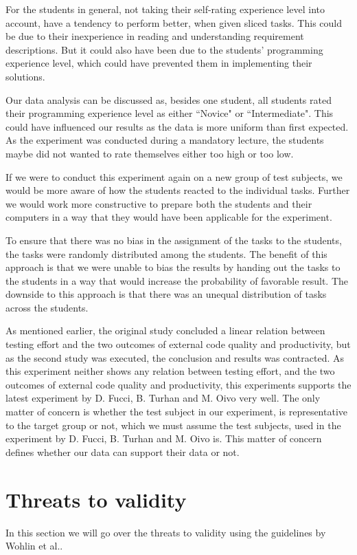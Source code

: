 \documentclass{sig-alternate-05-2015}
\begin{document}
For the students in general, not taking their self-rating experience level into account, have a tendency to perform better, when given sliced tasks. This could be due to their inexperience in reading and understanding requirement descriptions. But it could also have been due to the students' programming experience level, which could have prevented them in implementing their solutions.

Our data analysis can be discussed as, besides one student, all students rated their programming experience level as either ``Novice" or ``Intermediate". This could have influenced our results as the data is more uniform than first expected. As the experiment was conducted during a mandatory lecture, the students maybe did not wanted to rate themselves either too high or too low.

If we were to conduct this experiment again on a new group of test subjects, we would be more aware of how the students reacted to the individual tasks. Further we would work more constructive to prepare both the students and their computers in a way that they would have been applicable for the experiment. 

To ensure that there was no bias in the assignment of the tasks to the students, the tasks were randomly distributed among the students. The benefit of this approach is that we were unable to bias the results by handing out the tasks to the students in a way that would increase the probability of favorable result. The downside to this approach is that there was an unequal distribution of tasks across the students.

As mentioned earlier, the original study concluded a linear relation between testing effort and the two outcomes of external code quality and productivity, but as the second study was executed, the conclusion and results was contracted. As this experiment neither shows any relation between testing effort, and the two outcomes of external code quality and productivity, this experiments supports the latest experiment by D. Fucci, B. Turhan and M. Oivo very well. The only matter of concern is whether the test subject in our experiment, is representative to the target group or not, which we must assume the test subjects, used in the experiment by D. Fucci, B. Turhan and M. Oivo is. This matter of concern defines whether our data can support their data or not.


\section{Threats to validity}
\label{sec:Threats to validity}
In this section we will go over the threats to validity using the guidelines by Wohlin et al.\cite{wohlin1}.
\end{document}
